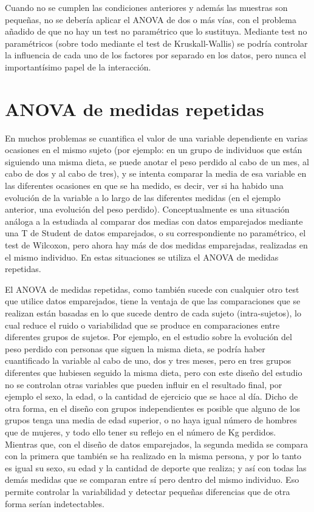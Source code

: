 \documentclass[
  spanish,
  a4paper,
]{scrreport}
\theoremstyle{plain}
\theoremstyle{definition}
\theoremstyle{definition}
\theoremstyle{remark}
\begin{document}
Cuando no se cumplen las condiciones anteriores y además las muestras
son pequeñas, no se debería aplicar el ANOVA de dos o más vías, con el
problema añadido de que no hay un test no paramétrico que lo sustituya.
Mediante test no paramétricos (sobre todo mediante el test de
Kruskall-Wallis) se podría controlar la influencia de cada uno de los
factores por separado en los datos, pero nunca el importantísimo papel
de la interacción.

\section{ANOVA de medidas repetidas}\label{anova-de-medidas-repetidas}

En muchos problemas se cuantifica el valor de una variable dependiente
en varias ocasiones en el mismo sujeto (por ejemplo: en un grupo de
individuos que están siguiendo una misma dieta, se puede anotar el peso
perdido al cabo de un mes, al cabo de dos y al cabo de tres), y se
intenta comparar la media de esa variable en las diferentes ocasiones en
que se ha medido, es decir, ver si ha habido una evolución de la
variable a lo largo de las diferentes medidas (en el ejemplo anterior,
una evolución del peso perdido). Conceptualmente es una situación
análoga a la estudiada al comparar dos medias con datos emparejados
mediante una T de Student de datos emparejados, o su correspondiente no
paramétrico, el test de Wilcoxon, pero ahora hay más de dos medidas
emparejadas, realizadas en el mismo individuo. En estas situaciones se
utiliza el ANOVA de medidas repetidas.

El ANOVA de medidas repetidas, como también sucede con cualquier otro
test que utilice datos emparejados, tiene la ventaja de que las
comparaciones que se realizan están basadas en lo que sucede dentro de
cada sujeto (intra-sujetos), lo cual reduce el ruido o variabilidad que
se produce en comparaciones entre diferentes grupos de sujetos. Por
ejemplo, en el estudio sobre la evolución del peso perdido con personas
que siguen la misma dieta, se podría haber cuantificado la variable al
cabo de uno, dos y tres meses, pero en tres grupos diferentes que
hubiesen seguido la misma dieta, pero con este diseño del estudio no se
controlan otras variables que pueden influir en el resultado final, por
ejemplo el sexo, la edad, o la cantidad de ejercicio que se hace al día.
Dicho de otra forma, en el diseño con grupos independientes es posible
que alguno de los grupos tenga una media de edad superior, o no haya
igual número de hombres que de mujeres, y todo ello tener su reflejo en
el número de Kg perdidos. Mientras que, con el diseño de datos
emparejados, la segunda medida se compara con la primera que también se
ha realizado en la misma persona, y por lo tanto es igual su sexo, su
edad y la cantidad de deporte que realiza; y así con todas las demás
medidas que se comparan entre sí pero dentro del mismo individuo. Eso
permite controlar la variabilidad y detectar pequeñas diferencias que de
otra forma serían indetectables.
\end{document}
